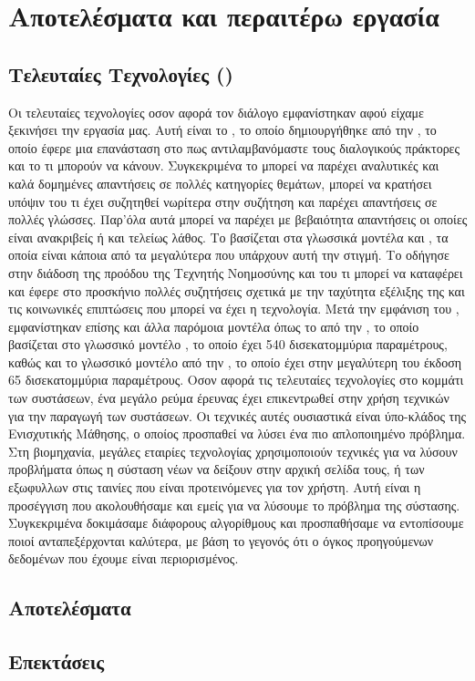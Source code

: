\chapter{Αποτελέσματα και περαιτέρω εργασία}
\label{chap:results}
\section{Τελευταίες Τεχνολογίες ()}

Οι τελευταίες τεχνολογίες οσον αφορά τον διάλογο εμφανίστηκαν αφού είχαμε ξεκινήσει την εργασία μας. Αυτή είναι το , το οποίο δημιουργήθηκε από την , το οποίο έφερε μια επανάσταση στο πως αντιλαμβανόμαστε τους διαλογικούς πράκτορες και το τι μπορούν να κάνουν. Συγκεκριμένα το  μπορεί να παρέχει αναλυτικές και καλά δομημένες απαντήσεις σε πολλές κατηγορίες θεμάτων, μπορεί να κρατήσει υπόψιν του τι έχει συζητηθεί νωρίτερα στην συζήτηση και παρέχει απαντήσεις σε πολλές γλώσσες. Παρ'όλα αυτά μπορεί να παρέχει με βεβαιότητα απαντήσεις οι οποίες είναι ανακριβείς ή και τελείως λάθος. Το  βασίζεται στα γλωσσικά μοντέλα  και , τα οποία είναι κάποια από τα μεγαλύτερα που υπάρχουν αυτή την στιγμή. Το  οδήγησε στην διάδοση της προόδου της Τεχνητής Νοημοσύνης και του τι μπορεί να καταφέρει και έφερε στο προσκήνιο πολλές συζητήσεις σχετικά με την ταχύτητα εξέλιξης της και τις κοινωνικές επιπτώσεις που μπορεί να έχει η τεχνολογία.
Μετά την εμφάνιση του , εμφανίστηκαν επίσης και άλλα παρόμοια μοντέλα όπως το  από την , το οποίο βασίζεται στο γλωσσικό μοντέλο , το οποίο έχει 540 δισεκατομμύρια παραμέτρους, καθώς και το γλωσσικό μοντέλο  από την , το οποίο έχει στην μεγαλύτερη του έκδοση 65 δισεκατομμύρια παραμέτρους.
Οσον αφορά τις τελευταίες τεχνολογίες στο κομμάτι των συστάσεων, ένα μεγάλο ρεύμα έρευνας έχει επικεντρωθεί στην χρήση τεχνικών  για την παραγωγή των συστάσεων. Οι τεχνικές αυτές ουσιαστικά είναι ύπο-κλάδος της Ενισχυτικής Μάθησης, ο οποίος προσπαθεί να λύσει ένα πιο απλοποιημένο πρόβλημα. Στη βιομηχανία, μεγάλες εταιρίες τεχνολογίας χρησιμοποιούν τεχνικές  για να λύσουν προβλήματα όπως η σύσταση νέων να δείξουν στην αρχική σελίδα τους, ή των εξωφυλλων στις ταινίες που είναι προτεινόμενες για τον χρήστη. Αυτή είναι η προσέγγιση που ακολουθήσαμε και εμείς για να λύσουμε το πρόβλημα της σύστασης. Συγκεκριμένα δοκιμάσαμε διάφορους αλγορίθμους και προσπαθήσαμε να εντοπίσουμε ποιοί ανταπεξέρχονται καλύτερα, με βάση το γεγονός ότι ο όγκος προηγούμενων δεδομένων που έχουμε είναι περιορισμένος.


\section{Αποτελέσματα}
\section{Επεκτάσεις}